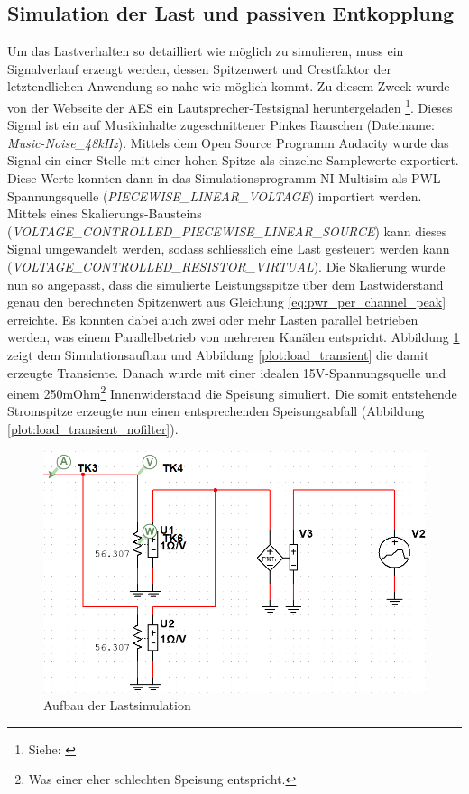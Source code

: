 \subsection{Simulation der Last und passiven Entkopplung}
Um das Lastverhalten so detailliert wie möglich zu simulieren, muss ein Signalverlauf erzeugt werden, dessen Spitzenwert und Crestfaktor der letztendlichen Anwendung so nahe wie möglich kommt. Zu diesem Zweck wurde von der Webseite der AES ein Lautsprecher-Testsignal heruntergeladen \footnote{Siehe: \cite{aes75}}. Dieses Signal ist ein auf Musikinhalte zugeschnittener Pinkes Rauschen (Dateiname: \textit{Music-Noise\_48kHz}). Mittels dem Open Source Programm Audacity wurde das Signal ein einer Stelle mit einer hohen Spitze als einzelne Samplewerte exportiert. Diese Werte konnten dann in das Simulationsprogramm NI Multisim als PWL-Spannungsquelle (\textit{PIECEWISE\_LINEAR\_VOLTAGE}) importiert werden. Mittels eines Skalierungs-Bausteins (\textit{VOLTAGE\_CONTROLLED\_PIECEWISE\_LINEAR\_SOURCE}) kann dieses Signal umgewandelt werden, sodass schliesslich eine Last gesteuert werden kann (\textit{VOLTAGE\_CONTROLLED\_RESISTOR\_VIRTUAL}). Die Skalierung wurde nun so angepasst, dass die simulierte Leistungsspitze über dem Lastwiderstand genau den berechneten Spitzenwert aus Gleichung \ref{eq:pwr_per_channel_peak} erreichte. Es konnten dabei auch zwei oder mehr Lasten parallel betrieben werden, was einem Parallelbetrieb von mehreren Kanälen entspricht. Abbildung \ref{pic:simulation_load} zeigt dem Simulationsaufbau und Abbildung \ref{plot:load_transient} die damit erzeugte Transiente.
Danach wurde mit einer idealen 15V-Spannungsquelle und einem 250mOhm\footnote{Was einer eher schlechten Speisung entspricht.} Innenwiderstand die Speisung simuliert. Die somit entstehende Stromspitze erzeugte nun einen entsprechenden Speisungsabfall (Abbildung \ref{plot:load_transient_nofilter}).
\begin{figure}[H]
	\centering
	\includegraphics[width=\textwidth*6/8]{pictures/simu_load.png}
	\caption{Aufbau der Lastsimulation}
	\label{pic:simulation_load}
\end{figure}

